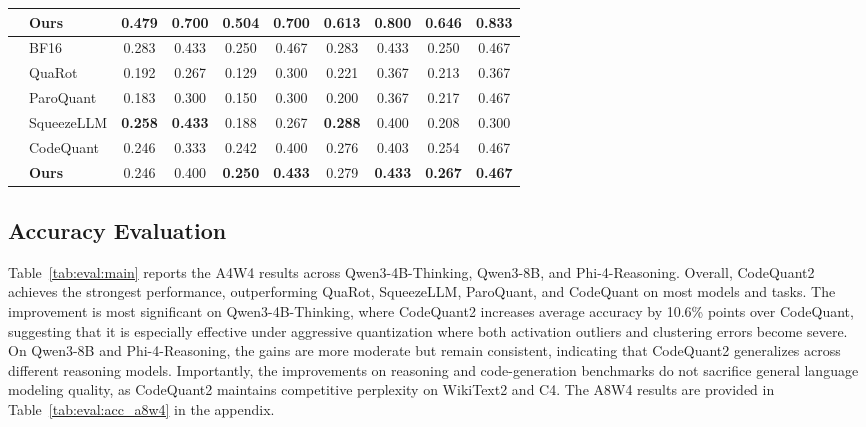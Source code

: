 \documentclass{article}
\begin{document}
\begin{table}[!t]
{\begin{tabular}{ll|cccc|cccc}
 & \textbf{Ours} & \textbf{0.479} & \textbf{0.700} & \textbf{0.504} & \textbf{0.700} & \textbf{0.613} & \textbf{0.800} & \textbf{0.646} & \textbf{0.833} \\
\midrule
{} & BF16 & 0.283 & 0.433 & 0.250 & 0.467 & 0.283 & 0.433 & 0.250 & 0.467 \\
 & QuaRot & 0.192 & 0.267 & 0.129 & 0.300 & 0.221 & 0.367 & 0.213 & 0.367 \\
 & ParoQuant & 0.183 & 0.300 & 0.150 & 0.300 & 0.200 & 0.367 & 0.217 & 0.467 \\
 & SqueezeLLM & \textbf{0.258} & \textbf{0.433} & 0.188 & 0.267 & \textbf{0.288} & 0.400 & 0.208 & 0.300 \\
 & CodeQuant & 0.246 & 0.333 & 0.242 & 0.400 & 0.276 & 0.403 & 0.254 & 0.467 \\
 & \textbf{Ours} & 0.246 & 0.400 & \textbf{0.250} & \textbf{0.433} & 0.279 & \textbf{0.433} & \textbf{0.267} & \textbf{0.467} \\
\bottomrule
\end{tabular}%
}
\par\vspace{-10pt}
\end{table}

\subsection{Accuracy Evaluation}
Table~\ref{tab:eval:main} reports the A4W4 results across Qwen3-4B-Thinking, Qwen3-8B, and Phi-4-Reasoning. Overall, CodeQuant2 achieves the strongest performance, outperforming QuaRot, SqueezeLLM, ParoQuant, and CodeQuant on most models and tasks. The improvement is most significant on Qwen3-4B-Thinking, where CodeQuant2 increases average accuracy by 10.6\% points over CodeQuant, suggesting that it is especially effective under aggressive quantization where both activation outliers and clustering errors become severe. On Qwen3-8B and Phi-4-Reasoning, the gains are more moderate but remain consistent, indicating that CodeQuant2 generalizes across different reasoning models. Importantly, the improvements on reasoning and code-generation benchmarks do not sacrifice general language modeling quality, as CodeQuant2 maintains competitive perplexity on WikiText2 and C4. The A8W4 results are provided in Table~\ref{tab:eval:acc_a8w4} in the appendix.
\end{document}
